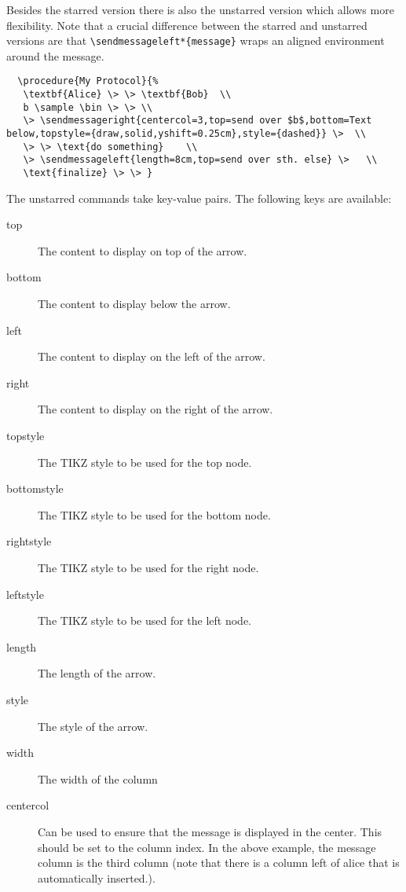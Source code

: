 \documentclass[a4paper]{report}
\begin{document}
  Besides the starred version there is also the unstarred version which allows more flexibility. Note that a crucial difference between
  the starred and unstarred versions are that  \lstinline$\sendmessageleft*{message}$ wraps an aligned environment around the message.
  \begin{center}
  \end{center}
  \begin{lstlisting}
  \procedure{My Protocol}{%
   \textbf{Alice} \> \> \textbf{Bob}  \\
   b \sample \bin \> \> \\
   \> \sendmessageright{centercol=3,top=send over $b$,bottom=Text below,topstyle={draw,solid,yshift=0.25cm},style={dashed}} \>  \\
   \> \> \text{do something}    \\
   \> \sendmessageleft{length=8cm,top=send over sth. else} \>   \\
   \text{finalize} \> \> }
  \end{lstlisting}
  The unstarred commands take key-value pairs. The following keys are available:
  \begin{description}
  \item[top]
  The content to display on top of the arrow. 
  \item[bottom]
  The content to display below the arrow.
  \item[left]
  The content to display on the left of the arrow.
  \item[right]
  The content to display on the right of the arrow.
  \item[topstyle]
  The TIKZ style to be used for the top node.
  \item[bottomstyle]
  The TIKZ style to be used for the bottom node.
  \item[rightstyle]
  The TIKZ style to be used for the right node.
  \item[leftstyle]
  The TIKZ style to be used for the left node.
  \item[length]
  The length of the arrow.
  \item[style]
  The style of the arrow.
  \item[width]
  The width of the column
  \item[centercol]
  Can be used to ensure that the message is displayed in the center. This should be set to the
  column index. In the above example, the message column is the third column (note that there is
  a column left of alice that  is automatically inserted.).
  \end{description}
  
\end{document}
